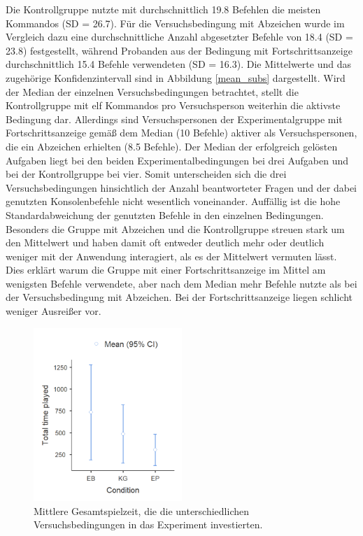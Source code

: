 Die Kontrollgruppe nutzte mit durchschnittlich 19.8 Befehlen die meisten Kommandos (SD = 26.7). Für die Versuchsbedingung mit Abzeichen wurde im Vergleich dazu eine durchschnittliche Anzahl abgesetzter Befehle von 18.4 (SD = 23.8) festgestellt, während Probanden aus der Bedingung mit Fortschrittsanzeige durchschnittlich 15.4 Befehle verwendeten (SD = 16.3). Die Mittelwerte und das zugehörige Konfidenzintervall sind in Abbildung \ref{mean_subs} dargestellt. Wird der Median der einzelnen Versuchsbedingungen betrachtet, stellt die Kontrollgruppe mit elf Kommandos pro Versuchsperson weiterhin die aktivste Bedingung dar. Allerdings sind Versuchspersonen der Experimentalgruppe mit Fortschrittsanzeige gemäß dem Median (10 Befehle) aktiver als Versuchspersonen, die ein Abzeichen erhielten (8.5 Befehle). Der Median der erfolgreich gelösten Aufgaben liegt bei den beiden Experimentalbedingungen bei drei Aufgaben und bei der Kontrollgruppe bei vier. Somit unterscheiden sich die drei Versuchsbedingungen hinsichtlich der Anzahl beantworteter Fragen und der dabei genutzten Konsolenbefehle nicht wesentlich voneinander. Auffällig ist die hohe Standardabweichung der genutzten Befehle in den einzelnen Bedingungen. Besonders die Gruppe mit Abzeichen und die Kontrollgruppe streuen stark um den Mittelwert und haben damit oft entweder deutlich mehr oder deutlich weniger mit der Anwendung interagiert, als es der Mittelwert vermuten lässt. Dies erklärt warum die Gruppe mit einer Fortschrittsanzeige im Mittel am wenigsten Befehle verwendete, aber nach dem Median mehr Befehle nutzte als bei der Versuchsbedingung mit Abzeichen. Bei der Fortschrittsanzeige liegen schlicht weniger Ausreißer vor.  

\begin{figure}[htbp]
    \centering
    \includegraphics[width=0.5\textwidth]{img/auswertung/mean_time.png}
    \caption{Mittlere Gesamtspielzeit, die die unterschiedlichen Versuchsbedingungen in das Experiment investierten.}
    \label{mean_time}
\end{figure}

